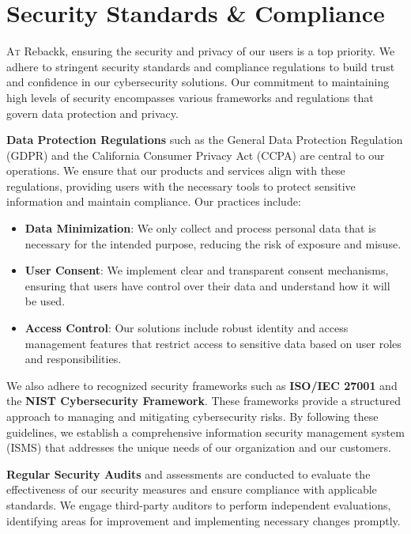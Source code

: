 \chapter{Security Standards \& Compliance}

\lettrine{A}{t} Rebackk, ensuring the security and privacy of our users is a top priority. We adhere to stringent security standards and compliance regulations to build trust and confidence in our cybersecurity solutions. Our commitment to maintaining high levels of security encompasses various frameworks and regulations that govern data protection and privacy.

\textbf{Data Protection Regulations} such as the General Data Protection Regulation (GDPR) and the California Consumer Privacy Act (CCPA) are central to our operations. We ensure that our products and services align with these regulations, providing users with the necessary tools to protect sensitive information and maintain compliance. Our practices include:

\begin{itemize}
    \item \textbf{Data Minimization}: We only collect and process personal data that is necessary for the intended purpose, reducing the risk of exposure and misuse.
    \item \textbf{User Consent}: We implement clear and transparent consent mechanisms, ensuring that users have control over their data and understand how it will be used.
    \item \textbf{Access Control}: Our solutions include robust identity and access management features that restrict access to sensitive data based on user roles and responsibilities.
\end{itemize}

We also adhere to recognized security frameworks such as \textbf{ISO/IEC 27001} and the \textbf{NIST Cybersecurity Framework}. These frameworks provide a structured approach to managing and mitigating cybersecurity risks. By following these guidelines, we establish a comprehensive information security management system (ISMS) that addresses the unique needs of our organization and our customers.

\textbf{Regular Security Audits} and assessments are conducted to evaluate the effectiveness of our security measures and ensure compliance with applicable standards. We engage third-party auditors to perform independent evaluations, identifying areas for improvement and implementing necessary changes promptly.


